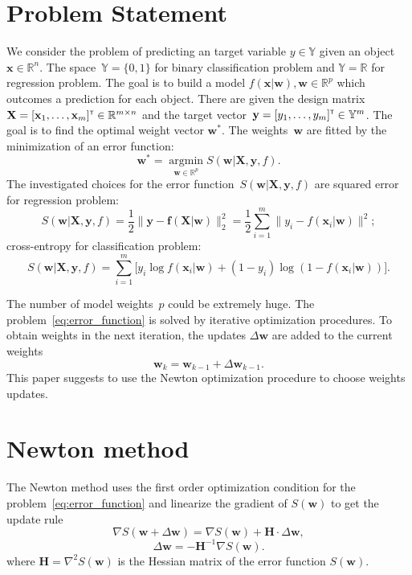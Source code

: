 \documentclass[a4paper,12pt]{article}
\theoremstyle{plain} %
\theoremstyle{definition} %
\theoremstyle{remark} %
\newcommand{\bw}{\mathbf{w}}
\newcommand{\by}{\mathbf{y}}
\newcommand{\bx}{\mathbf{x}}
\newcommand{\bbR}{\mathbb{R}}
\newcommand{\bbY}{\mathbb{Y}}
\newcommand{\bH}{\mathbf{H}}
\newcommand{\bX}{\mathbf{X}}
\newcommand{\T}{{\text{\tiny\sffamily\upshape\mdseries T}}}
\newcommand{\argmin}{\mathop{\arg \min}\limits}
\begin{document}
		
	\section*{Problem Statement}

	We consider the problem of predicting an target variable $y \in \bbY$ given an object $\bx \in \bbR^{n}$. The space~$\bbY = \{0, 1\}$ for binary classification problem and $\bbY = \bbR$ for regression problem.
	The goal is to build a model $f(\bx | \bw), \bw \in \mathbb{R}^p$ which outcomes a prediction for each object.
	There are given the design matrix~$\bX = [\bx_1, \dots, \bx_m]^{\T} \in \bbR^{m \times n}$ and the target vector~$\by = [y_1, \dots, y_m]^{\T} \in \bbY^{m}$. 
	The goal is to find the optimal weight vector $\bw^*$.
	The weights~$\bw$ are fitted by the minimization of an error function:
	\begin{equation}
	\bw^* = \argmin_{\bw \in \bbR^p} S(\bw | \bX, \by, f).
	\label{eq:error_function}
	\end{equation}
	The investigated choices for the error function~$S(\bw | \bX, \by, f)$ are
	squared error for regression problem: 
		\begin{equation}
			S(\bw | \bX, \by, f) = \frac 12 \| \by - \mathbf{f}(\bX | \bw) \|_2^2 = \frac 12 \sum_{i=1}^m \| y_i - f(\bx_i | \bw)\|^2;
			\label{eq:squared_error}
		\end{equation}
	cross-entropy for classification problem: 
		\begin{equation}
			S(\bw | \bX, \by, f) = \sum_{i=1}^m \bigl[y_i \log f (\bx_i | \bw) + (1-y_i) \log (1 - f (\bx_i | \bw))\bigr].
			\label{eq:log_loss}
		\end{equation}
	
	The number of model weights~$p$ could be extremely huge. 
	The problem~\eqref{eq:error_function} is solved by iterative optimization procedures. 
	To obtain weights in the next iteration, the updates $\Delta \bw$ are added to the current weights
	\begin{equation}
		\bw_k = \bw_{k - 1} + \Delta \bw_{k - 1}.
		\label{eq:update_rule}
	\end{equation}
	This paper suggests to use the Newton optimization procedure to choose weights updates.

	\section*{Newton method}
	
	The Newton method uses the first order optimization condition for the problem~\eqref{eq:error_function} and linearize the gradient of $S(\bw)$ to get the update rule
	\[
		\nabla S (\bw + \Delta \bw) = \nabla S(\bw) + \bH \cdot \Delta \bw,
	\]
	\[
		\Delta \bw = - \bH^{-1} \nabla S(\bw).
	\]
	where $\bH = \nabla^2 S(\bw)$ is the Hessian matrix of the error function $S(\bw)$.
	
\end{document}
